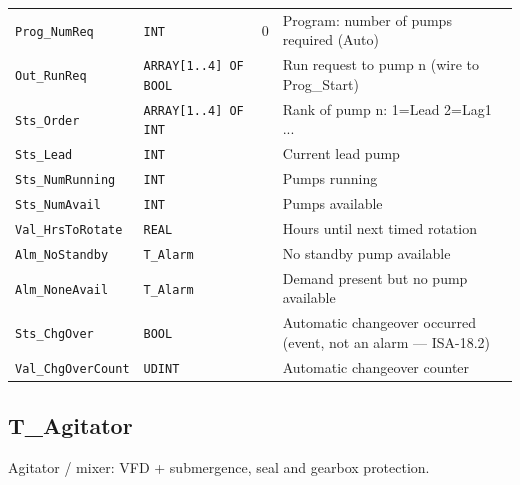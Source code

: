 \begin{small}
\begin{longtable}{@{}P{3.70cm}P{2.20cm}P{1.70cm}P{8.91cm}@{}}
\texttt{Prog\_NumReq} & \texttt{INT} & 0 & Program: number of pumps required (Auto) \\
\texttt{Out\_RunReq} & \texttt{ARRAY[1..4] OF BOOL} &  & Run request to pump n (wire to Prog\_Start) \\
\texttt{Sts\_Order} & \texttt{ARRAY[1..4] OF INT} &  & Rank of pump n: 1=Lead 2=Lag1 ... \\
\texttt{Sts\_Lead} & \texttt{INT} &  & Current lead pump \\
\texttt{Sts\_NumRunning} & \texttt{INT} &  & Pumps running \\
\texttt{Sts\_NumAvail} & \texttt{INT} &  & Pumps available \\
\texttt{Val\_HrsToRotate} & \texttt{REAL} &  & Hours until next timed rotation \\
\texttt{Alm\_NoStandby} & \texttt{T\_Alarm} &  & No standby pump available \\
\texttt{Alm\_NoneAvail} & \texttt{T\_Alarm} &  & Demand present but no pump available \\
\texttt{Sts\_ChgOver} & \texttt{BOOL} &  & Automatic changeover occurred (event, not an alarm --- ISA-18.2) \\
\texttt{Val\_ChgOverCount} & \texttt{UDINT} &  & Automatic changeover counter \\
\bottomrule
\end{longtable}
\end{small}

\subsection{T\_Agitator}\label{sec:pclib-t-agitator}

Agitator /\allowbreak{} mixer: VFD + submergence, seal and gearbox protection.

\par{}\par

